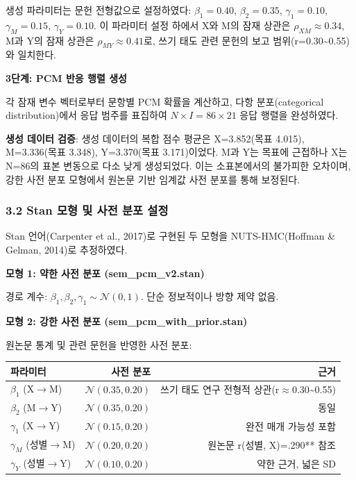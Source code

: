 \documentclass[a4paper,10pt]{oblivoir}
\begin{document}
생성 파라미터는 문헌 전형값으로 설정하였다: $\beta_1=0.40$, $\beta_2=0.35$, $\gamma_1=0.10$, $\gamma_M=0.15$, $\gamma_Y=0.10$. 이 파라미터 설정 하에서 X와 M의 잠재 상관은 $\rho_{XM} \approx 0.34$, M과 Y의 잠재 상관은 $\rho_{MY} \approx 0.41$로, 쓰기 태도 관련 문헌의 보고 범위(r=0.30\~{}0.55)와 일치한다.


\noindent\textbf{3단계: PCM 반응 행렬 생성}


각 잠재 변수 벡터로부터 문항별 PCM 확률을 계산하고, 다항 분포(categorical distribution)에서 응답 범주를 표집하여 $N \times I = 86 \times 21$ 응답 행렬을 완성하였다.

\textbf{생성 데이터 검증}: 생성 데이터의 복합 점수 평균은 X=3.852(목표 4.015), M=3.336(목표 3.348), Y=3.370(목표 3.171)이었다. M과 Y는 목표에 근접하나 X는 N=86의 표본 변동으로 다소 낮게 생성되었다. 이는 소표본에서의 불가피한 오차이며, 강한 사전 분포 모형에서 원논문 기반 임계값 사전 분포를 통해 보정된다.

\subsubsection{3.2 Stan 모형 및 사전 분포 설정}

Stan 언어(Carpenter et al., 2017)로 구현된 두 모형을 NUTS-HMC(Hoffman \& Gelman, 2014)로 추정하였다.


\noindent\textbf{모형 1: 약한 사전 분포 (sem\_pcm\_v2.stan)}


경로 계수: $\beta_1, \beta_2, \gamma_1 \sim \mathcal{N}(0, 1)$. 단순 정보적이나 방향 제약 없음.


\noindent\textbf{모형 2: 강한 사전 분포 (sem\_pcm\_with\_prior.stan)}


원논문 통계 및 관련 문헌을 반영한 사전 분포:

\begin{table}[htbp]
\centering
\small
\begin{tabular}{lrr}
\toprule
파라미터 & 사전 분포 & 근거 \\
\midrule
$\beta_1$ (X\ensuremath{\rightarrow}M) & $\mathcal{N}(0.35, 0.20)$ & 쓰기 태도 연구 전형적 상관(r\ensuremath{\approx}0.30\~{}0.55) \\
$\beta_2$ (M\ensuremath{\rightarrow}Y) & $\mathcal{N}(0.35, 0.20)$ & 동일 \\
$\gamma_1$ (X\ensuremath{\rightarrow}Y) & $\mathcal{N}(0.15, 0.20)$ & 완전 매개 가능성 포함 \\
$\gamma_M$ (성별\ensuremath{\rightarrow}M) & $\mathcal{N}(0.20, 0.20)$ & 원논문 r(성별, X)=.290** 참조 \\
$\gamma_Y$ (성별\ensuremath{\rightarrow}Y) & $\mathcal{N}(0.10, 0.20)$ & 약한 근거, 넓은 SD \\
\bottomrule
\end{tabular}
\end{table}
\end{document}
